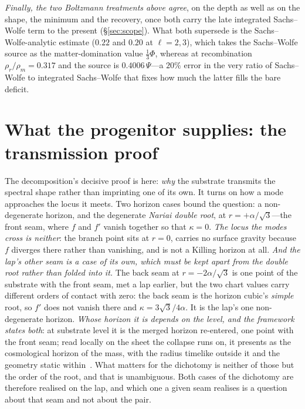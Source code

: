\documentclass[11pt,a4paper]{article}
\theoremstyle{plain}
\theoremstyle{definition}
\theoremstyle{remark}
\begin{document}
\emph{Finally, the two Boltzmann treatments above agree}, on the depth as well as on the shape, the minimum and the recovery, once both carry the late integrated Sachs--Wolfe term to the present (\S\ref{sec:scope}). What both supersede is the Sachs--Wolfe-analytic estimate ($0.22$ and $0.20$ at $\ell=2,3$), which takes the Sachs--Wolfe source as the matter-domination value $\tfrac13\Phi$, whereas at recombination $\rho_r/\rho_m=0.317$ and the source is $0.4006\,\Psi$---a $20\%$ error in the very ratio of Sachs--Wolfe to integrated Sachs--Wolfe that fixes how much the latter fills the bare deficit.


\section{What the progenitor supplies: the transmission proof}\label{sec:transmission}

The decomposition's decisive proof is here: \emph{why} the substrate transmits the spectral shape rather than imprinting one of its own. It turns on how a mode approaches the locus it meets. Two horizon cases bound the question: a non-degenerate horizon, and the degenerate \emph{Nariai double root}, at $r=+\alpha/\sqrt3$---the front seam, where $f$ and $f'$ vanish together so that $\kappa=0$. \emph{The locus the modes cross is neither}: the branch point sits at $r=0$, carries no surface gravity because $f$ diverges there rather than vanishing, and is not a Killing horizon at all. \emph{And the lap's other seam is a case of its own, which must be kept apart from the double root rather than folded into it.} The back seam at $r=-2\alpha/\sqrt3$ is one point of the substrate with the front seam, met a lap earlier, but the two chart values carry different orders of contact with zero: the back seam is the horizon cubic's \emph{simple} root, so $f'$ does not vanish there and $\kappa=3\sqrt3/4\alpha$. It is the lap's one non-degenerate horizon. \emph{Whose horizon it is depends on the level, and the framework states both}: at substrate level it is the merged horizon re-entered, one point with the front seam; read locally on the sheet the collapse runs on, it presents as the cosmological horizon of the mass, with the radius timelike outside it and the geometry static within~\cite{JanzenCRframework,JanzenSlicing}. What matters for the dichotomy is neither of those but the order of the root, and that is unambiguous. Both cases of the dichotomy are therefore realised on the lap, and which one a given seam realises is a question about that seam and not about the pair.
\end{document}
